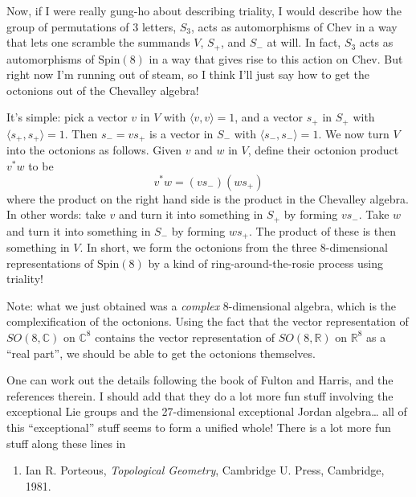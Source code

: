\documentclass{article}
\def\tightlist{}
\begin{document}
Now, if I were really gung-ho about describing triality, I would
describe how the group of permutations of 3 letters, \(S_3\), acts as
automorphisms of \(\mathrm{Chev}\) in a way that lets one scramble the
summands \(V\), \(S_+\), and \(S_-\) at will. In fact, \(S_3\) acts as
automorphisms of \(\mathrm{Spin}(8)\) in a way that gives rise to this
action on \(\mathrm{Chev}\). But right now I'm running out of steam, so
I think I'll just say how to get the octonions out of the Chevalley
algebra!

It's simple: pick a vector \(v\) in \(V\) with
\(\langle v,v \rangle = 1\), and a vector \(s_+\) in \(S_+\) with
\(\langle s_+,s_+ \rangle = 1\). Then \(s_- = vs_+\) is a vector in
\(S_-\) with \(\langle s_-,s_- \rangle = 1\). We now turn \(V\) into the
octonions as follows. Given \(v\) and \(w\) in \(V\), define their
octonion product \(v^*w\) to be \[v^*w = (v s_-) (w s_+)\] where the
product on the right hand side is the product in the Chevalley algebra.
In other words: take \(v\) and turn it into something in \(S_+\) by
forming \(v s_-\). Take \(w\) and turn it into something in \(S_-\) by
forming \(w s_+\). The product of these is then something in \(V\). In
short, we form the octonions from the three 8-dimensional
representations of \(\mathrm{Spin}(8)\) by a kind of
ring-around-the-rosie process using triality!

Note: what we just obtained was a \emph{complex} 8-dimensional algebra,
which is the complexification of the octonions. Using the fact that the
vector representation of \(SO(8,\mathbb{C})\) on \(\mathbb{C}^8\)
contains the vector representation of \(SO(8,\mathbb{R})\) on
\(\mathbb{R}^8\) as a ``real part'', we should be able to get the
octonions themselves.

One can work out the details following the book of Fulton and Harris,
and the references therein. I should add that they do a lot more fun
stuff involving the exceptional Lie groups and the 27-dimensional
exceptional Jordan algebra\ldots{} all of this ``exceptional'' stuff
seems to form a unified whole! There is a lot more fun stuff along these
lines in

\begin{enumerate}
\def\labelenumi{\arabic{enumi})}
\setcounter{enumi}{2}
\tightlist
\item
  Ian R. Porteous, \emph{Topological Geometry}, Cambridge U. Press,
  Cambridge, 1981.
\end{enumerate}
\end{document}
